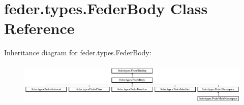 \hypertarget{classfeder_1_1types_1_1FederBody}{}\section{feder.\+types.\+Feder\+Body Class Reference}
\label{classfeder_1_1types_1_1FederBody}
Inheritance diagram for feder.\+types.\+Feder\+Body\+:\begin{figure}[H]
\begin{center}
\leavevmode
\includegraphics[height=2.074074cm]{classfeder_1_1types_1_1FederBody}
\end{center}
\end{figure}
